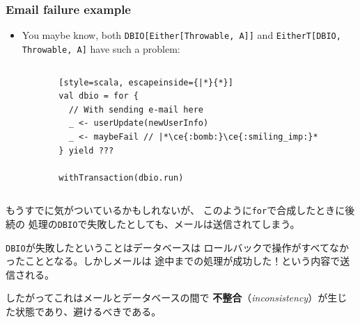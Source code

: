 \begin{frame}[fragile]
  \frametitle{Email failure example}

  \pause
  \begin{itemize}
    \item You maybe know,
    both \lstinline|DBIO[Either[Throwable, A]]| and
    \lstinline|EitherT[DBIO, Throwable, A]| have such a problem:
  \end{itemize}
  
  \begin{columns}
    \begin{column}{0.6\textwidth}
    \end{column}
    \begin{column}{0.4\textwidth}
\begin{lstlisting}[style=scala, escapeinside={|*}{*}]
val dbio = for {
  // With sending e-mail here
  _ <- userUpdate(newUserInfo)
  _ <- maybeFail // |*\ce{:bomb:}\ce{:smiling_imp:}*
} yield ???

withTransaction(dbio.run)
\end{lstlisting}
    \end{column}
  \end{columns}

  \pause
  
  \begin{notes}
    \item もうすでに気がついているかもしれないが、
    このように\lstinline|for|で合成したときに後続の
    処理の\lstinline|DBIO|で失敗したとしても、メールは送信されてしまう。

    \item \lstinline|DBIO|が失敗したということはデータベースは
    ロールバックで操作がすべてなかったこととなる。しかしメールは
    途中までの処理が成功した！という内容で送信される。

    \item したがってこれはメールとデータベースの間で
    \textbf{不整合}（\emph{inconsistency}）が生じた状態であり、避けるべきである。
  \end{notes}
\end{frame}

